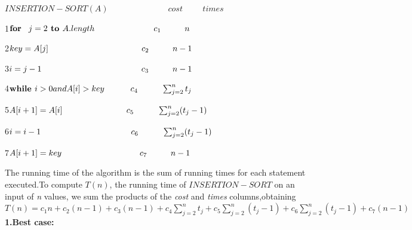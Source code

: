 \documentclass[12 pt,a4paper]{report}
\begin{document}
$INSERTION-SORT(A)  \hspace{3cm}cost \hspace{1cm}times$
\vspace{0.4cm}

1\hspace{0.75cm}$\textbf{for}\hspace{0.3cm}j=2 \textbf{ to } A.length\hspace{2.5cm}c_1\hspace{1cm} n  $

2\hspace{1.5cm}$key=A[j]\hspace{3.94cm}c_2\hspace{1cm}n-1$

3\hspace{1.5cm}$i=j-1\hspace{4.2cm}c_3\hspace{1cm}n-1$

4\hspace{1.5cm}$\textbf{while }i>0 and A[i]>key\hspace{1.1cm}c_4\hspace{1cm}\sum_{j=2}^nt_j$

5\hspace{2cm}$A[i+1]=A[i]\hspace{2.7cm}c_5\hspace{1cm}\sum_{j=2}^n(t_j-1)$

6\hspace{2cm}$i=i-1\hspace{3.8cm}c_6\hspace{1cm}\sum_{j=2}^n(t_j-1)$

7\hspace{1.5cm}$A[i+1]=key\hspace{3.3cm}c_7\hspace{1cm}n-1$


\vspace{1.5cm}



The running time of the algorithm is the sum of running times for each statement executed.To compute $T(n)$, the  running time of $INSERTION-SORT$ on an input of \textit{n} values, we sum the products of the \textit{cost} and \textit{times} columns,obtaining\\

$T(n)=c_1n+c_2(n-1)+c_3(n-1)+c_4\sum_{j=2}^nt_j + c_5\sum_{j=2}^n(t_j-1)+ c_6\sum_{j=2}^n(t_j-1) + c_7(n-1)$\\

\textbf{1.Best case:}
\end{document}
